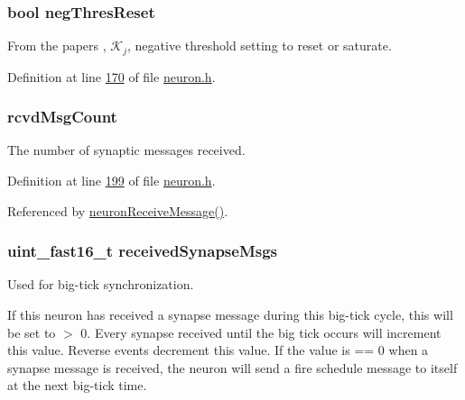 \subsubsection[{neg\+Thres\+Reset}]{\setlength{\rightskip}{0pt plus 5cm}bool neg\+Thres\+Reset}\label{structneuron_state_a3ec480684e7a2cfc67a8ef7ac1bf57b9}


From the paper\textquotesingle{}s , $𝒦_j$, negative threshold setting to reset or saturate. 



Definition at line \hyperlink{neuron_8h_source_l00170}{170} of file \hyperlink{neuron_8h_source}{neuron.\+h}.

\hypertarget{structneuron_state_ab8f63a1dfdb2992657530ff8a63fdc01}{}
\subsubsection[{rcvd\+Msg\+Count}]{ rcvd\+Msg\+Count}\label{structneuron_state_ab8f63a1dfdb2992657530ff8a63fdc01}


The number of synaptic messages received. 



Definition at line \hyperlink{neuron_8h_source_l00199}{199} of file \hyperlink{neuron_8h_source}{neuron.\+h}.



Referenced by \hyperlink{neuron_8c_source_l00104}{neuron\+Receive\+Message()}.

\hypertarget{structneuron_state_af8935bcba177f2f3dfb9119c39ef7dc5}{}
\subsubsection[{received\+Synapse\+Msgs}]{\setlength{\rightskip}{0pt plus 5cm}uint\+\_\+fast16\+\_\+t received\+Synapse\+Msgs}\label{structneuron_state_af8935bcba177f2f3dfb9119c39ef7dc5}


Used for big-\/tick synchronization. 

If this neuron has received a synapse message during this big-\/tick cycle, this will be set to $>$ 0. Every synapse received until the big tick occurs will increment this value. Reverse events decrement this value. If the value is == 0 when a synapse message is received, the neuron will send a fire schedule message to itself at the next big-\/tick time. 

